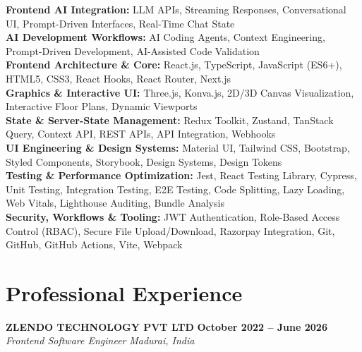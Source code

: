 \documentclass[letterpaper,10pt]{article}
\newcommand{\resumeSubheading}[4]{%
  \vspace{1pt}%
  \textbf{#1} \hfill \textbf{#2}\\
  \textit{#3} \hfill \textit{#4}\\[-3pt]
}
\begin{document}
\textbf{Frontend AI Integration:} LLM APIs, Streaming Responses, Conversational UI, Prompt-Driven Interfaces, Real-Time Chat State\\
\textbf{AI Development Workflows:} AI Coding Agents, Context Engineering, Prompt-Driven Development, AI-Assisted Code Validation\\
\textbf{Frontend Architecture \& Core:} React.js, TypeScript, JavaScript (ES6+), HTML5, CSS3, React Hooks, React Router, Next.js\\
\textbf{Graphics \& Interactive UI:} Three.js, Konva.js, 2D/3D Canvas Visualization, Interactive Floor Plans, Dynamic Viewports\\
\textbf{State \& Server-State Management:} Redux Toolkit, Zustand, TanStack Query, Context API, REST APIs, API Integration, Webhooks\\
\textbf{UI Engineering \& Design Systems:} Material UI, Tailwind CSS, Bootstrap, Styled Components, Storybook, Design Systems, Design Tokens\\
\textbf{Testing \& Performance Optimization:} Jest, React Testing Library, Cypress, Unit Testing, Integration Testing, E2E Testing, Code Splitting, Lazy Loading, Web Vitals, Lighthouse Auditing, Bundle Analysis\\
\textbf{Security, Workflows \& Tooling:} JWT Authentication, Role-Based Access Control (RBAC), Secure File Upload/Download, Razorpay Integration, Git, GitHub, GitHub Actions, Vite, Webpack


\section{Professional Experience}

\resumeSubheading
  {ZLENDO TECHNOLOGY PVT LTD}{October 2022 -- June 2026}
  {Frontend Software Engineer}{Madurai, India}
\end{document}

